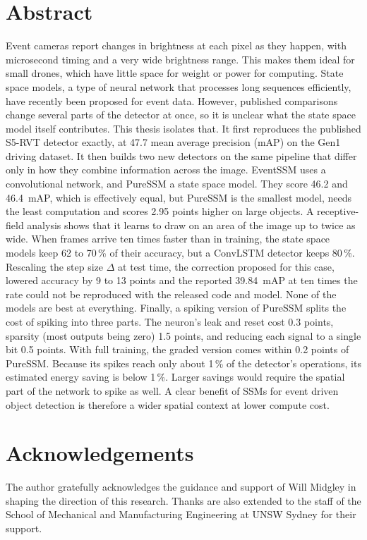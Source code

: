 \documentclass[11pt, a4paper]{report}
\begin{document}
\chapter*{Abstract}
Event cameras report changes in brightness at each pixel as they happen, with microsecond timing and a very
wide brightness range. This makes them ideal for small drones, which have little space for weight or power
for computing. State space models, a type of neural network that processes long sequences efficiently, have
recently been proposed for event data. However, published comparisons change several parts of the detector
at once, so it is unclear what the state space model itself contributes. This thesis isolates that. It first
reproduces the published S5-RVT detector exactly, at 47.7 mean average precision (mAP) on the Gen1 driving
dataset. It then builds two new detectors on the same pipeline that differ only in how they combine
information across the image. EventSSM uses a convolutional network, and PureSSM a state space model. They
score 46.2 and 46.4~mAP, which is effectively equal, but PureSSM is the smallest model, needs the least
computation and scores 2.95 points higher on large objects. A receptive-field analysis shows
that it learns to draw on an area of the image up to twice as wide. When frames arrive ten times faster than
in training, the state space models keep 62 to 70\,\% of their accuracy, but a ConvLSTM detector keeps
80\,\%. Rescaling the step size $\Delta$ at test time, the correction proposed for this case, lowered accuracy by
9 to 13 points and the reported 39.84~mAP at ten times the rate could not be
reproduced with the released code and model. None of the models are best at everything. Finally, a spiking version of PureSSM splits the cost of spiking into three
parts. The neuron's leak and reset cost 0.3 points, sparsity (most outputs being zero) 1.5 points, and reducing each signal to a single bit 0.5 points.
With full training, the graded version comes within 0.2 points of PureSSM. Because its spikes reach only about 1\,\% of the detector's operations,
its estimated energy saving is below 1\,\%. Larger savings would require the spatial part of the network to
spike as well. A clear benefit of SSMs for event driven object detection is therefore a wider spatial context at lower compute cost.

\chapter*{Acknowledgements}
The author gratefully acknowledges the guidance and support of Will Midgley in shaping the direction of
this research. Thanks are also extended to the staff of the School of Mechanical and Manufacturing
Engineering at UNSW Sydney for their support.
\end{document}

